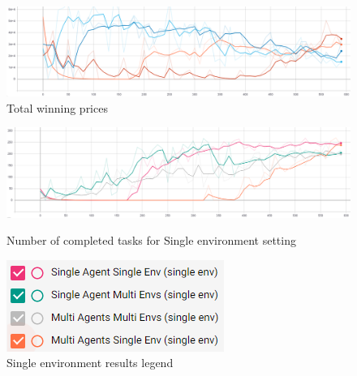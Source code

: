\begin{figure}[H]
    \centering
    \includegraphics[width=\linewidth]{figures/5_evaluation_figs/env_training_fig/total_winning_prices.PNG}
    \caption{Total winning prices}
    \label{fig:env_winning_prices}
\end{figure}

\begin{figure}[H]
    \centering
    \begin{minipage}{0.75\linewidth}
        \centering
        \includegraphics[width=\linewidth]{figures/5_evaluation_figs/env_training_fig/single_env_num_completed_tasks.png}
        \caption{Number of completed tasks for Single environment setting}
        \label{fig:single_env_num_completed_tasks}
    \end{minipage}\hfill
    \begin{minipage}{0.25\linewidth}
        \centering
        \includegraphics[width=\linewidth]{figures/5_evaluation_figs/env_training_fig/single_env_legend.png}
        \caption{Single environment results legend}
        \label{fig:single_env_legend}
    \end{minipage}
\end{figure}


